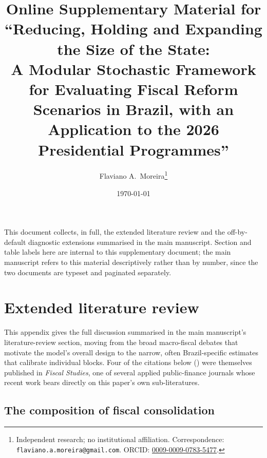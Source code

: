 \documentclass[11pt,a4paper]{article}
\title{\textbf{Online Supplementary Material for \\
``Reducing, Holding and Expanding the Size of the State: \\
A Modular Stochastic Framework for Evaluating Fiscal Reform Scenarios in Brazil, with an Application to the 2026 Presidential Programmes''}}
\author{Flaviano A.\ Moreira\thanks{Independent research; no institutional affiliation. Correspondence: \texttt{flaviano.a.moreira@gmail.com}. ORCID: \href{https://orcid.org/0009-0009-0783-5477}{0009-0009-0783-5477}.}}
\date{\today}
\begin{document}
\maketitle

\noindent This document collects, in full, the extended literature review and the off-by-default diagnostic extensions summarised in the main manuscript. Section and table labels here are internal to this supplementary document; the main manuscript refers to this material descriptively rather than by number, since the two documents are typeset and paginated separately.

\appendix
\section{Extended literature review}
\label{app:lit}

\noindent This appendix gives the full discussion summarised in the main manuscript's literature-review section, moving from the broad macro-fiscal debates that motivate the model's overall design to the narrow, often Brazil-specific estimates that calibrate individual blocks. Four of the citations below (\citealp{levyyeyatisturzenegger2023,lagopenasetal2024,hanousekkocenda2011,balladaresgarciamiralles2026}) were themselves published in \textit{Fiscal Studies}, one of several applied public-finance journals whose recent work bears directly on this paper's own sub-literatures.

\subsection{The composition of fiscal consolidation}
\end{document}
